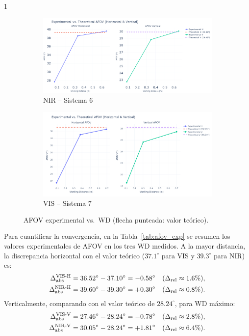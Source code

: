      1\begin{figure}[H]
       \centering
       \begin{subfigure}[b]{.9\linewidth}
         \includegraphics[width=\linewidth]{Figures/C4/afov_nir.png}
         \caption{NIR – Sistema 6}
       \end{subfigure}
       \hfill
       \begin{subfigure}[b]{0.9\linewidth}
         \includegraphics[width=\linewidth]{Figures/C4/afov_vis.png}
         \caption{VIS – Sistema 7}
       \end{subfigure}
       \caption{AFOV experimental vs.\ WD (flecha punteada: valor teórico).}
       \label{fig:afov}
     \end{figure}
     
     Para cuantificar la convergencia, en la Tabla~\ref{tab:afov_exp} se resumen los valores experimentales de AFOV en los tres WD medidos. A la mayor distancia, la discrepancia horizontal con el valor teórico ($37.1^\circ$ para VIS y $39.3^\circ$ para NIR) es:
     \[
     \begin{aligned}
     \Delta_{\rm abs}^{\rm VIS\text{-}H} &=36.52^\circ - 37.10^\circ = -0.58^\circ\quad(\Delta_{\rm rel}\approx1.6\%),\\
     \Delta_{\rm abs}^{\rm NIR\text{-}H} &=39.60^\circ - 39.30^\circ = +0.30^\circ\quad(\Delta_{\rm rel}\approx0.8\%).
     \end{aligned}
     \]
     Verticalmente, comparando con el valor teórico de $28.24^\circ$, para WD máximo:
     \[
     \begin{aligned}
     \Delta_{\rm abs}^{\rm VIS\text{-}V} &=27.46^\circ - 28.24^\circ = -0.78^\circ\quad(\Delta_{\rm rel}\approx2.8\%),\\
     \Delta_{\rm abs}^{\rm NIR\text{-}V} &=30.05^\circ - 28.24^\circ = +1.81^\circ\quad(\Delta_{\rm rel}\approx6.4\%).
     \end{aligned}
     \]
     
